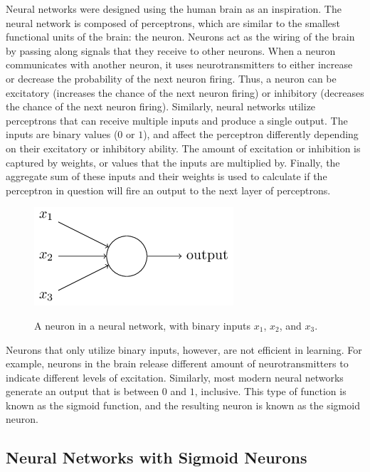 Neural networks were designed using the human brain as an inspiration.
The neural network is composed of perceptrons, which are similar to the smallest functional units of the brain: the neuron.
Neurons act as the wiring of the brain by passing along signals that they receive to other neurons.
When a neuron communicates with another neuron, it uses neurotransmitters to either increase or decrease the probability of the next neuron firing.
Thus, a neuron can be excitatory (increases the chance of the next neuron firing) or inhibitory (decreases the chance of the next neuron firing).
Similarly, neural networks utilize perceptrons that can receive multiple inputs and produce a single output.
The inputs are binary values ($0$ or $1$), and affect the perceptron differently depending on their excitatory or inhibitory ability.
The amount of excitation or inhibition is captured by weights, or values that the inputs are multiplied by.
Finally, the aggregate sum of these inputs and their weights is used to calculate if the perceptron in question will fire an output to the next layer of perceptrons. 

\begin{figure}[h]
    \centering
        \caption{A neuron in a neural network, with binary inputs $x_1$, $x_2$, and $x_3$.}
    \includegraphics[scale=1.0]{pictures/NeuralNetworks/sigmoidNeuron.png}
    \label{fig:sigmoidNeuron}
\end{figure}

Neurons that only utilize binary inputs, however, are not efficient in learning.
For example, neurons in the brain release different amount of neurotransmitters to indicate different levels of excitation.
Similarly, most modern neural networks generate an output that is between $0$ and $1$, inclusive.
This type of function is known as the sigmoid function, and the resulting neuron is known as the sigmoid neuron. 

\subsection{Neural Networks with Sigmoid Neurons}

